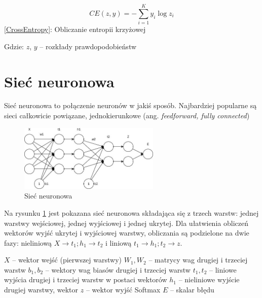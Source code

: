 \documentclass{article}
\begin{document}
\begin{center}
	\begin{equation}	
		CE(z, y) = -\sum_{i=1}^{K}y_i \log z_i
		\label{CrossEntropy}
	\end{equation}
	\ref{CrossEntropy}: Obliczanie entropii krzyżowej
\end{center} 

\begin{flushleft}
	Gdzie:\newline
	$z$, $y$ -- rozkłady prawdopodobieństw
\end{flushleft}

\section{Sieć neuronowa}
Sieć neuronowa to połączenie neuronów w jakiś sposób. Najbardziej popularne są sieci całkowicie powiązane, jednokierunkowe (ang. \textit{feedforward, fully connected})

\begin{figure}[H]
	\centering
	\includegraphics[width=0.6\textwidth,keepaspectratio=true]{feed_forward_network}
	\caption{
		Sieć neuronowa  
	}
	\label{feed_forward_network}
\end{figure}

Na rysunku \ref{feed_forward_network} jest pokazana sieć neuronowa składająca się z trzech warstw: jednej warstwy wejściowej, jednej wyjściowej i jednej ukrytej. Dla ułatwienia obliczeń wektorów wyjść ukrytej i wyjściowej warstwy, obliczania są podzielone na dwie fazy: nieliniową $X \rightarrow t_1; h_1 \rightarrow t_2$ i liniową $t_1 \rightarrow h_1; t_2 \rightarrow z$.

\begin{flushleft}
	$X$ -- wektor wejść (pierwszej warstwy) \newline
	$W_1, W_2$ -- matrycy wag drugiej i trzeciej warstw \newline
	$b_1, b_2$ -- wektory wag biasów drugiej i trzeciej warstw \newline
	$t_1, t_2$ -- liniowe wyjścia drugiej i trzeciej warstw w postaci wektorów\newline
	$h_1$ -- nieliniowe wyjście drugiej warstwy, wektor \newline
	$z$ -- wektor wyjść Softmax \newline
	$E$ -- skalar błędu
\end{flushleft}
\end{document}
